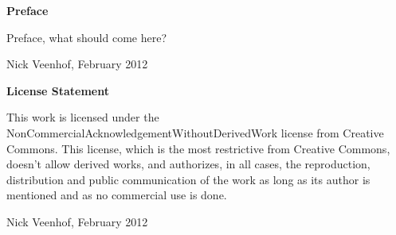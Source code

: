 
\newpage

\noindent \textbf{\huge Preface}

\vspace{1.5cm}

\noindent

Preface, what should come here?

\addvspace{4cm}

\noindent Nick Veenhof, February 2012\newpage

\noindent \textbf{\huge License Statement}

\vspace{1.5cm}

\noindent
This work is licensed under the NonCommercialAcknowledgementWithoutDerivedWork license from Creative Commons. 
This license, which is the most restrictive from Creative Commons, doesn't allow derived works, and authorizes, in all cases, the reproduction, distribution and public communication of the work as long as its author is mentioned and as no commercial use is done.

\addvspace{4cm}

\noindent Nick Veenhof, February 2012

